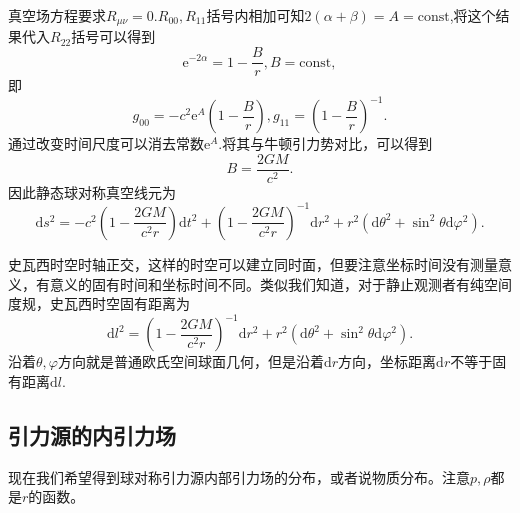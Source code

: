 \documentclass[11pt, a4paper, oneside, onecolumn]{ctexart}
\numberwithin{equation}{subsection}
\begin{document}
真空场方程要求$R_{\mu\nu}=0$.$R_{00},R_{11}$括号内相加可知$2\left(\alpha+\beta\right)=A=\text{const}$,将这个结果代入$R_{22}$括号可以得到
\begin{equation}
\mathrm{e}^{-2\alpha}=1-\frac{B}{r},B=\text{const},
\end{equation}
即
\begin{equation}
g_{00}=-c^{2}\mathrm{e}^{A}\left(1-\frac{B}{r}\right),g_{11}=\left(1-\frac{B}{r}\right)^{-1}.
\end{equation}
通过改变时间尺度可以消去常数$\mathrm{e}^{A}$.将其与牛顿引力势对比，可以得到
\begin{equation}
B=\frac{2GM}{c^{2}}.
\end{equation}
因此静态球对称真空线元为
\begin{equation}
\mathrm{d}s^{2}=-c^{2}\left(1-\frac{2GM}{c^{2}r}\right)\mathrm{d}t^{2}+\left(1-\frac{2GM}{c^{2}r}\right)^{-1}\mathrm{d}r^{2}+r^{2}\left(\mathrm{d}\theta^{2}+\sin^{2}\theta\mathrm{d}\varphi^{2}\right).
\end{equation}

史瓦西时空时轴正交，这样的时空可以建立同时面，但要注意坐标时间没有测量意义，有意义的固有时间和坐标时间不同。类似我们知道，对于静止观测者有纯空间度规，史瓦西时空固有距离为
\begin{equation}
\mathrm{d}l^{2}=\left(1-\frac{2GM}{c^{2}r}\right)^{-1}\mathrm{d}r^{2}+r^{2}\left(\mathrm{d}\theta^{2}+\sin^{2}\theta\mathrm{d}\varphi^{2}\right).
\end{equation}
沿着$\theta,\varphi$方向就是普通欧氏空间球面几何，但是沿着$\mathrm{d}r$方向，坐标距离$\mathrm{d}r$不等于固有距离$\mathrm{d}l$.

\subsection{引力源的内引力场}
现在我们希望得到球对称引力源内部引力场的分布，或者说物质分布。注意$p,\rho$都是$r$的函数。
\end{document}
